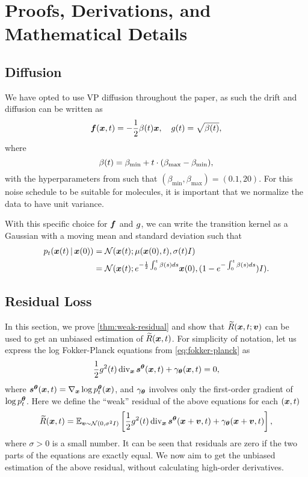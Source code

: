 \section{Proofs, Derivations, and Mathematical Details} \label{appx:proofs}
\subsection{Diffusion} \label{appx:vp-diffusion}
We have opted to use \gls{VP} diffusion \citep{song2021} throughout the paper, as such the drift and diffusion can be written as
\begin{equation}
    {\bm{f}}({{\bm{x}}}, {t}) = - \frac{1}{2} \beta({t}) {{\bm{x}}}, \quad {g}({t}) = \sqrt{\beta({t})} ,
\end{equation}
where 
\begin{equation}
    \beta({t}) = \beta_\text{min} + {t} \cdot (\beta_\text{max} - \beta_\text{min}),
\end{equation}
with the hyperparameters from \cite{song2021} such that $(\beta_\text{min}, \beta_\text{max})=(0.1, 20)$. For this noise schedule to be suitable for molecules, it is important that we normalize the data to have unit variance.

With this specific choice for ${\bm{f}}$ and ${g}$, we can write the transition kernel as a Gaussian \citep{saarka2019} with a moving mean and standard deviation such that
\begin{align}
    p_{{t}}({{\bm{x}}}({t}) \,|\, {{\bm{x}}}(0)) &= \mathcal{N} ({{\bm{x}}}({t}); \mu({{\bm{x}}}(0), {t}), \sigma({t}) I ) \\
    &= \mathcal{N} ({{\bm{x}}}({t}); e^{-\frac{1}{2} \int_{0}^{t} \beta(s) ds} {{\bm{x}}}(0), (1 - e^{-\int_{0}^{t} \beta(s) ds}) I).
\end{align}

\subsection{Residual Loss} \label{appx:residual-term}
In this section, we prove \cref{thm:weak-residual} and show that $\widetilde{R}({{\bm{x}}}, {t}; {\bm{v}})$ can be used to get an unbiased estimation of $\widetilde{R}({{\bm{x}}}, {t})$. 
For simplicity of notation, let us express the log Fokker-Planck equations from \cref{eq:fokker-planck} as 
\begin{equation}
\frac{1}{2}{g}^{2}({t})\operatorname{div}_{{\bm{x}}} {{\bm{s}}^{\bm{\theta}}}({{\bm{x}}},{t})+\gamma_{{\bm{\theta}}}({{\bm{x}}},{t}) = 0, 
\end{equation}
where ${{\bm{s}}^{\bm{\theta}}}({{\bm{x}}},{t})=\nabla_{{{\bm{x}}}}\log p^{\bm{\theta}}_t({{\bm{x}}})$, and $\gamma_{\bm{\theta}}$ involves only the first-order gradient of $\log p^{\bm{\theta}}_t$.
Here we define the \enquote{weak} residual \citep{guo2022fieldflows} of the above equations for each $({{\bm{x}}}, {t})$
\begin{equation}
\widetilde{R}({{\bm{x}}},{t}) = \mathbb{E}_{{\bm{v}} \sim{\mathcal{N}}(0,\sigma^2 I)}\left[\frac{1}{2}{g}^{2}({t})\operatorname{div}_{{\bm{x}}} {{\bm{s}}^{\bm{\theta}}}({{\bm{x}}}+{\bm{v}},{t})+\gamma_{{\bm{\theta}}}({{\bm{x}}}+{\bm{v}},{t})\right],
\end{equation}
where $\sigma>0$ is a small number. It can be seen that residuals are zero if the two parts of the equations are exactly equal. We now aim to get the unbiased estimation of the above residual, without calculating high-order derivatives.


